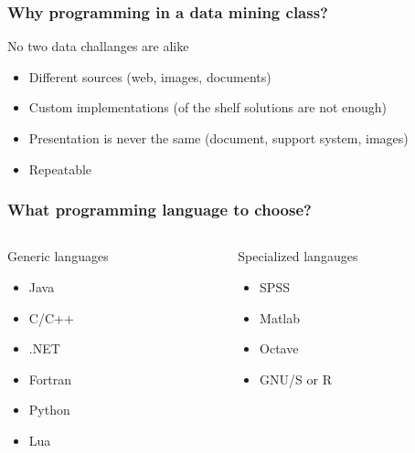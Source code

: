 \documentclass[]{beamer}
\begin{document}
\begin{frame}
  \frametitle{Why programming in a data mining class?}
 
  \begin{block}{No two data challanges are alike}
    \begin{itemize}[<+->]
    \item Different sources (web, images, documents)
    \item Custom implementations (of the shelf solutions are not
      enough)
    \item Presentation is never the same (document, support system,
      images)
    \item Repeatable
    \end{itemize}  
  \end{block}
\end{frame}


\begin{frame}
  \frametitle{What programming language to choose?}
  
  \begin{columns}
    \begin{column}{0.5\textwidth}
      \begin{block}{Generic languages}
        \begin{itemize}
        \item Java 
        \item C/C++
        \item .NET 
        \item Fortran
        \item Python 
        \item Lua
        \end{itemize}
      \end{block}
    \end{column}
    \begin{column}{0.5\textwidth}
      \begin{block}{Specialized langauges}
        \begin{itemize}
        \item SPSS
        \item Matlab
        \item Octave
        \item GNU/S or R
        \end{itemize}
      \end{block}
    \end{column}
  \end{columns}  
\end{frame}
\end{document}
